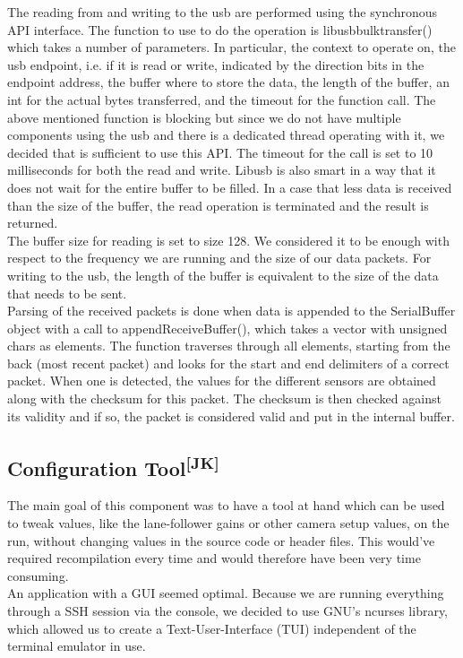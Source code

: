 \noindent
The reading from and writing to the usb are performed using the synchronous API
interface. The function to use to do the operation is
libusb\textunderscore bulk\textunderscore transfer() which takes a number of
parameters. In particular, the context to operate on, the usb endpoint, i.e. if
it is read or write, indicated by the direction bits in the endpoint address,
the buffer where to store the data, the length of the buffer, an int for the
actual bytes transferred, and the timeout for the function call. The above
mentioned function is blocking but since we do not have multiple components
using the usb and there is a dedicated thread operating with it, we decided that
is sufficient to use this API. The timeout for the call is set to 10
milliseconds for both the read and write. Libusb is also smart in a way that it
does not wait for the entire buffer to be filled. In a case that less data is
received than the size of the buffer, the read operation is terminated and the
result is returned.\\
The buffer size for reading is set to size 128. We considered it to be enough
with respect to the frequency we are running and the size of our data packets.
For writing to the usb, the length of the buffer is equivalent to the size of
the data that needs to be sent.\\

\noindent
Parsing of the received packets is done when data is appended to the
SerialBuffer object with a call to appendReceiveBuffer(), which takes a vector
with unsigned chars as elements. The function traverses through all elements,
starting from the back (most recent packet) and looks for the start and end
delimiters of a correct packet. When one is detected, the values for the
different sensors are obtained along with the checksum for this packet. The
checksum is then checked against its validity and if so, the packet is
considered valid and put in the internal buffer.

\subsection[Configuration Tool]{Configuration Tool\textsuperscript{[JK]}}
The main goal of this component was to have a tool at hand which can be used to
tweak values, like the lane-follower gains or other camera setup values, on the
run, without changing values in the source code or header files. This would've
required recompilation every time and would therefore have been very time
consuming.\\
An application with a GUI seemed optimal. Because we are running everything
through a SSH session via the console, we decided to use GNU's ncurses library,
which allowed us to create a Text-User-Interface (TUI) independent of the
terminal emulator in use.\\

